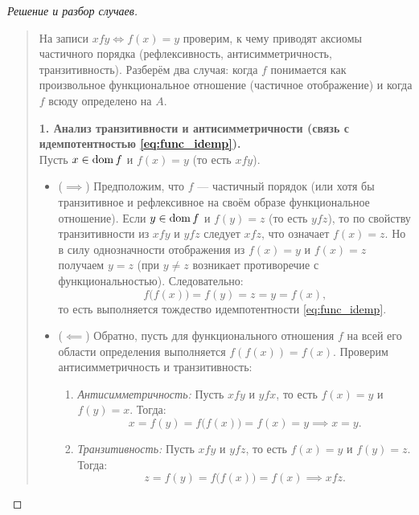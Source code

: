\begin{proof}[Решение и разбор случаев]~\\
    \begin{quote}
        На записи $x f y \iff f(x) = y$ проверим, к чему приводят аксиомы 
        частичного порядка (рефлексивность, антисимметричность, 
        транзитивность). Разберём два случая: когда $f$ понимается как 
        произвольное функциональное отношение (частичное отображение) и 
        когда $f$ всюду определено на $A$.

        \textbf{1. Анализ транзитивности и антисимметричности (связь с 
        идемпотентностью \eqref{eq:func_idemp}).}\\
        Пусть $x \in \operatorname{dom} f$ и $f(x) = y$ (то есть $x f y$).
        \begin{itemize}
            \item($\implies$) Предположим, что $f$ --- частичный порядок 
            (или хотя бы транзитивное и рефлексивное на своём образе 
            функциональное отношение). Если $y \in \operatorname{dom} f$ и $f(y) = z$ 
            (то есть $y f z$), то по свойству транзитивности из $x f y$ и 
            $y f z$ следует $x f z$, что означает $f(x) = z$. Но в силу 
            однозначности отображения из $f(x) = y$ и $f(x) = z$ получаем 
            $y = z$ (при $y \neq z$ возникает противоречие с функциональностью). 
            Следовательно:
            \[
                f\bigl(f(x)\bigr) = f(y) = z = y = f(x),
            \]
            то есть выполняется тождество идемпотентности 
            \eqref{eq:func_idemp}.
            \item ($\impliedby$) Обратно, пусть для функционального 
            отношения $f$ на всей его области определения выполняется 
            $f(f(x)) = f(x)$. Проверим антисимметричность и транзитивность:
            \begin{enumerate}
                \item \emph{Антисимметричность:} Пусть $x f y$ и $y f x$, 
                то есть $f(x) = y$ и $f(y) = x$. Тогда:
                \[
                    x = f(y) = f\bigl(f(x)\bigr) = f(x) = y \implies x = y.
                \]
                \item \emph{Транзитивность:} Пусть $x f y$ и $y f z$, то 
                есть $f(x) = y$ и $f(y) = z$. Тогда:
                \[
                    z = f(y) = f\bigl(f(x)\bigr) = f(x) \implies x f z.
                \]
            \end{enumerate}
        \end{itemize}


\end{quote}
\end{proof}
